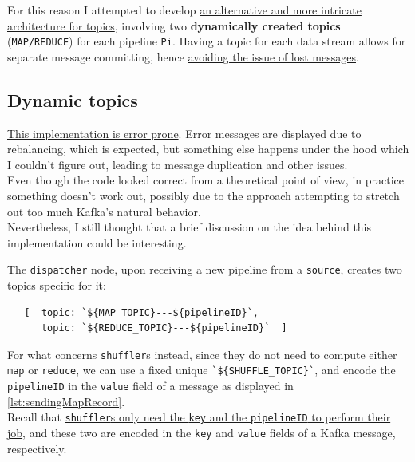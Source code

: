 
For this reason I attempted to develop \ul{an alternative and more intricate architecture for topics}, involving two \textbf{dynamically created topics} (\verb|MAP/REDUCE|) for each pipeline \verb|Pi|.
Having a topic for each data stream allows for separate message committing, hence \ul{avoiding the issue of lost messages}.

\subsection{Dynamic topics}

\ul{This implementation is error prone}. Error messages are displayed due to rebalancing, which is expected, but something else happens under the hood which I couldn't figure out, leading to message duplication and other issues.\\
Even though the code looked correct from a theoretical point of view, in practice something doesn't work out, possibly due to the approach attempting to stretch out too much Kafka's natural behavior.\\
Nevertheless, I still thought that a brief discussion on the idea behind this implementation could be interesting.  

The \texttt{dispatcher} node, upon receiving a new pipeline from a \texttt{source}, creates two topics specific for it:
\begin{lstlisting}
   [  topic: `${MAP_TOPIC}---${pipelineID}`,
      topic: `${REDUCE_TOPIC}---${pipelineID}`  ]
\end{lstlisting}

For what concerns \texttt{shuffler}s instead, since they do not need to compute either \verb|map| or \verb|reduce|, we can use a fixed unique \verb|`${SHUFFLE_TOPIC}`|, and encode the \verb|pipelineID| in the \verb|value| field of a message as displayed in \ref{lst:sendingMapRecord}.\\
Recall that \ul{\texttt{shuffler}s only need the \texttt{key} and the \texttt{pipelineID} to perform their job}, and these two are encoded in the \verb|key| and \verb|value| fields of a Kafka message, respectively. 


